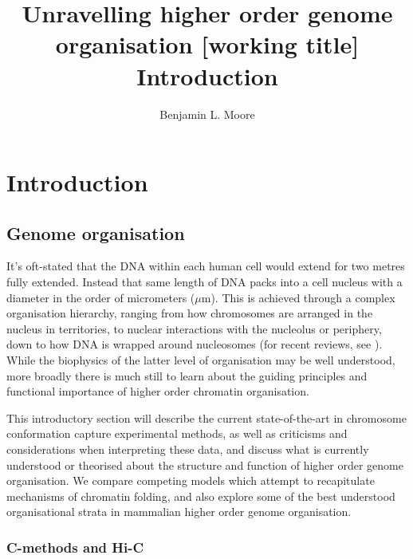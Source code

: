 \documentclass[a4paper,11pt,oneside]{book}
\title{ \vspace{3in} Unravelling higher order genome organisation {\small [working
    title]} \\ \vspace{2em} {\large {\bf Introduction}} }
\author{Benjamin L. Moore}
\begin{document}

\chapter{Introduction}
\section{Genome organisation}\label{intro:genomeorg}
%
It's oft-stated that the DNA within each human cell would extend for two metres fully extended. Instead that same length of DNA packs into a cell nucleus with a diameter in the order of micrometers ($\mu$m). This is achieved through a complex organisation hierarchy, ranging from how chromosomes are arranged in the nucleus in territories, to nuclear interactions with the nucleolus or periphery, down to how DNA is wrapped around nucleosomes (for recent reviews, see ). While the biophysics of the latter level of organisation may be well understood, more broadly there is much still to learn about the guiding principles and functional importance of higher order chromatin organisation.

This introductory section will describe the current state-of-the-art in chromosome conformation capture experimental methods, as well as criticisms and considerations when interpreting these data, and discuss what is currently understood or theorised about the structure and function of higher order genome organisation. We compare competing models which attempt to recapitulate mechanisms of chromatin folding, and also explore some of the best understood organisational strata in mammalian higher order genome organisation.

%

\subsection{C-methods and Hi-C}
\end{document}
